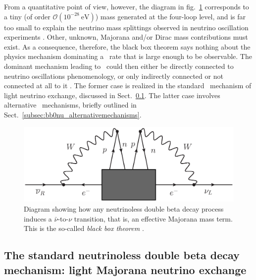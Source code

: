 From a quantitative point of view, however, the diagram in fig.~\ref{fig:blackbox} corresponds to a tiny (of order $\mathcal{O}(10^{-28}~\mathrm{eV})$) mass generated at the four-loop level, and is far too small to explain the neutrino mass splittings observed in neutrino oscillation experiments \cite{Duerr:2011zd}. Other, unknown, Majorana and/or Dirac mass contributions must exist. As a consequence, therefore, the black box theorem says nothing about the physics mechanism dominating a \bbonu\ rate that is large enough to be observable. The dominant mechanism leading to \bbonu\ could then either be directly connected to neutrino oscillations phenomenology, or only indirectly connected or not connected at all to it \cite{Rodejohann:2011mu}. The former case is realized in the standard \bbonu\ mechanism of light neutrino exchange, discussed in Sect.~\ref{subsec:bb0nu_lightmajoranaexchange}. The latter case involves alternative \bbonu\ mechanisms, briefly outlined in Sect.~\ref{subsec:bb0nu_alternativemechanisms}.

\begin{figure}[t!b!]
\begin{center}
\includegraphics[scale=0.65]{img/blackbox.eps}
\end{center}
\caption{Diagram showing how any neutrinoless double beta decay process induces a $\bar{\nu}$-to-$\nu$ transition, that is, an effective Majorana mass term. This is the so-called \emph{black box theorem} \cite{Schechter:1981bd}.} \label{fig:blackbox}
\end{figure}


\subsection{The standard neutrinoless double beta decay mechanism: light Majorana neutrino exchange} \label{subsec:bb0nu_lightmajoranaexchange}


